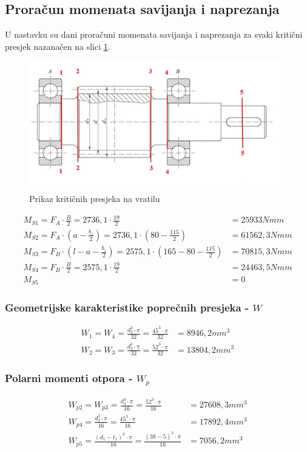 \documentclass[11pt,a4paper]{article}
\begin{document}
\subsection{Proračun momenata savijanja i naprezanja}
U nastavku su dani proračuni momenata savijanja i naprezanja za svaki kritični presjek nazanačen na slici \ref{KriticniPresjeci}.
\begin{figure}[h]
\centering
\includegraphics[width=1\textwidth]{KriticniPresjeci}
\caption{Prikaz kritičnih presjeka na vratilu}\label{KriticniPresjeci}
\end{figure}
\begin{align*}
M_{S1}=F_A \cdot \frac{B}{2}=2736,1 \cdot \frac{19}{2}&=25933Nmm\\
M_{S2}=F_A \cdot \left(a- \frac{b_z}{2}\right)=2736,1 \cdot \left(80- \frac{115}{2}\right)&=61562,3Nmm\\
M_{S3}=F_B \cdot \left(l-a- \frac{b_z}{2}\right)=2575,1 \cdot \left(165-80- \frac{115}{2}\right)&=70815,3Nmm\\
M_{S4}=F_B \cdot \frac{B}{2}=2575,1 \cdot \frac{19}{2}&=24463,5Nmm\\
M_{S5}&=0
\end{align*}

\subsubsection*{Geometrijske karakteristike poprečnih presjeka - $W$}
\begin{align*}
W_1=W_4=\frac{d_2^3 \cdot \pi}{32}=\frac{45^3 \cdot \pi}{32}&=8946,2mm^3\\
W_2=W_3=\frac{d_3^3 \cdot \pi}{32}=\frac{52^3 \cdot \pi}{32}&=13804,2mm^3
\end{align*}
\subsubsection*{Polarni momenti otpora - $W_p$}
\begin{align*}
W_{p2}=W_{p3}=\frac{d_3^3 \cdot \pi}{16}=\frac{52^3 \cdot \pi}{16}&=27608,3mm^3\\
W_{p4}=\frac{d_2^3 \cdot \pi}{16}=\frac{45^3 \cdot \pi}{16}&=17892,4mm^3\\
W_{p5}=\frac{(d_1-t_1)^3 \cdot \pi}{16}=\frac{(38-5)^3 \cdot \pi}{16}&=7056,2mm^3
\end{align*}
\end{document}
